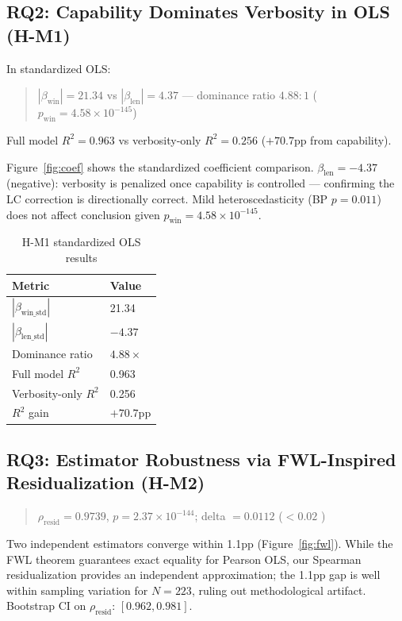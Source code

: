 \subsection{RQ2: Capability Dominates Verbosity in OLS (H-M1)}

In standardized OLS:

\begin{quote}
$|\beta_{\mathrm{win}}| = 21.34$ vs $|\beta_{\mathrm{len}}| = 4.37$ --- dominance ratio
$4.88{:}1$ ($p_{\mathrm{win}} = 4.58 \times 10^{-145}$)
\end{quote}

Full model $R^2 = 0.963$ vs verbosity-only $R^2 = 0.256$ ($+70.7$pp from capability).

Figure~\ref{fig:coef} shows the standardized coefficient comparison.
$\beta_{\mathrm{len}} = -4.37$ (negative): verbosity is penalized once capability is
controlled --- confirming the LC correction is directionally correct. Mild heteroscedasticity
(BP $p = 0.011$) does not affect conclusion given $p_{\mathrm{win}} = 4.58 \times 10^{-145}$.

\begin{table}[h]
\centering
\caption{H-M1 standardized OLS results}
\label{tab:hm1}
\begin{tabular}{ll}
\toprule
Metric & Value \\
\midrule
$|\beta_{\mathrm{win\_std}}|$ & 21.34 \\
$|\beta_{\mathrm{len\_std}}|$ & $-4.37$ \\
Dominance ratio & $4.88\times$ \\
Full model $R^2$ & 0.963 \\
Verbosity-only $R^2$ & 0.256 \\
$R^2$ gain & $+70.7$pp \\
\bottomrule
\end{tabular}
\end{table}

\subsection{RQ3: Estimator Robustness via FWL-Inspired Residualization (H-M2)}

\begin{quote}
$\rho_{\mathrm{resid}} = 0.9739$, $p = 2.37 \times 10^{-144}$;
delta $= 0.0112$ ($< 0.02$ \checkmark)
\end{quote}

Two independent estimators converge within 1.1pp (Figure~\ref{fig:fwl}). While the FWL
theorem guarantees exact equality for Pearson OLS, our Spearman residualization provides an
independent approximation; the 1.1pp gap is well within sampling variation for $N=223$, ruling
out methodological artifact. Bootstrap CI on $\rho_{\mathrm{resid}}$: $[0.962, 0.981]$.

